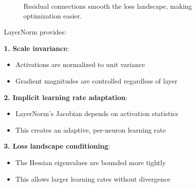 \begin{figure}[h]
\centering
\caption{Residual connections smooth the loss landscape, making optimization easier.}
\end{figure}

\begin{remark}
    LayerNorm provides:

    \textbf{1. Scale invariance}:
    \begin{itemize}
        \item Activations are normalized to unit variance
        \item Gradient magnitudes are controlled regardless of layer
    \end{itemize}

    \textbf{2. Implicit learning rate adaptation}:
    \begin{itemize}
        \item LayerNorm's Jacobian depends on activation statistics
        \item This creates an adaptive, per-neuron learning rate
    \end{itemize}

    \textbf{3. Loss landscape conditioning}:
    \begin{itemize}
        \item The Hessian eigenvalues are bounded more tightly
        \item This allows larger learning rates without divergence
    \end{itemize}
\end{remark}

